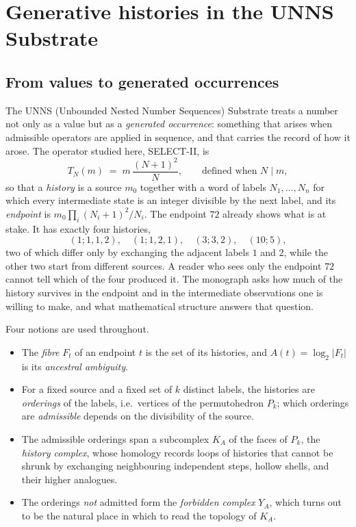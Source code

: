 \chapter{Generative histories in the UNNS Substrate}\label{ch:intro}

\section{From values to generated occurrences}
The UNNS (Unbounded Nested Number Sequences) Substrate treats a number not only as a value but as a \emph{generated occurrence}: something that arises when admissible operators are applied in sequence, and that carries the record of how it arose. The operator studied here, SELECT-II, is
\[
T_N(m)\;=\;m\,\frac{(N+1)^2}{N},\qquad \text{defined when } N\mid m ,
\]
so that a \emph{history} is a source $m_0$ together with a word of labels $N_1,\dots,N_n$ for which every intermediate state is an integer divisible by the next label, and its \emph{endpoint} is $m_0\prod_i (N_i+1)^2/N_i$. The endpoint $72$ already shows what is at stake. It has exactly four histories,
\[
(1;1,1,2),\quad(1;1,2,1),\quad(3;3,2),\quad(10;5),
\]
two of which differ only by exchanging the adjacent labels $1$ and $2$, while the other two start from different sources. A reader who sees only the endpoint $72$ cannot tell which of the four produced it. The monograph asks how much of the history survives in the endpoint and in the intermediate observations one is willing to make, and what mathematical structure answers that question.

Four notions are used throughout.
\begin{itemize}[nosep]
\item The \emph{fibre} $F_t$ of an endpoint $t$ is the set of its histories, and $A(t)=\log_2|F_t|$ is its \emph{ancestral ambiguity}.
\item For a fixed source and a fixed set of $k$ distinct labels, the histories are \emph{orderings} of the labels, i.e.\ vertices of the permutohedron $P_k$; which orderings are \emph{admissible} depends on the divisibility of the source.
\item The admissible orderings span a subcomplex $K_A$ of the faces of $P_k$, the \emph{history complex}, whose homology records loops of histories that cannot be shrunk by exchanging neighbouring independent steps, hollow shells, and their higher analogues.
\item The orderings \emph{not} admitted form the \emph{forbidden complex} $Y_A$, which turns out to be the natural place in which to read the topology of $K_A$.
\end{itemize}


